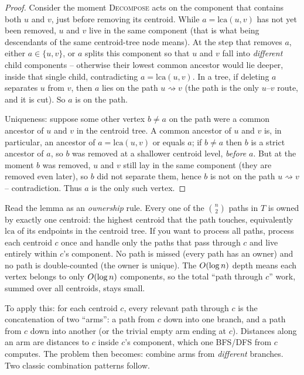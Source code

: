 \begin{proof}
Consider the moment \textsc{Decompose} acts on the component that contains both $u$
and $v$, just before removing its centroid. While $a=\mathrm{lca}(u,v)$ has not
yet been removed, $u$ and $v$ live in the same component (that is what being
descendants of the same centroid-tree node means). At the step that removes $a$,
either $a\in\{u,v\}$, or $a$ splits this component so that $u$ and $v$ fall into
\emph{different} child components -- otherwise their lowest common ancestor would
lie deeper, inside that single child, contradicting $a=\mathrm{lca}(u,v)$. In a
tree, if deleting $a$ separates $u$ from $v$, then $a$ lies on the path
$u\!\rightsquigarrow\! v$ (the path is the only $u$--$v$ route, and it is cut). So
$a$ is on the path.

Uniqueness: suppose some other vertex $b\neq a$ on the path were a common ancestor
of $u$ and $v$ in the centroid tree. A common ancestor of $u$ and $v$ is, in
particular, an ancestor of $a=\mathrm{lca}(u,v)$ or equals $a$; if $b\neq a$ then
$b$ is a strict ancestor of $a$, so $b$ was removed at a shallower centroid level,
\emph{before} $a$. But at the moment $b$ was removed, $u$ and $v$ still lay in the
same component (they are removed even later), so $b$ did not separate them, hence
$b$ is not on the path $u\!\rightsquigarrow\! v$ -- contradiction. Thus $a$ is the
only such vertex.
\end{proof}

\begin{intuitionbox}
Read the lemma as an \emph{ownership} rule. Every one of the $\binom{n}{2}$ paths
in $T$ is owned by exactly one centroid: the highest centroid that the path
touches, equivalently $\mathrm{lca}$ of its endpoints in the centroid tree. If you
want to process all paths, process each centroid $c$ once and handle only the paths
that pass through $c$ and live entirely within $c$'s component. No path is missed
(every path has an owner) and no path is double-counted (the owner is unique). The
$O(\log n)$ depth means each vertex belongs to only $O(\log n)$ components, so
the total ``path through $c$'' work, summed over all centroids, stays small.
\end{intuitionbox}

To apply this: for each centroid $c$, every relevant path through $c$ is the
concatenation of two ``arms'': a path from $c$ down into one branch, and a path
from $c$ down into another (or the trivial empty arm ending at $c$). Distances
along an arm are distances to $c$ inside $c$'s component, which one BFS/DFS
from $c$ computes. The problem then becomes: combine arms from \emph{different}
branches. Two classic combination patterns follow.

